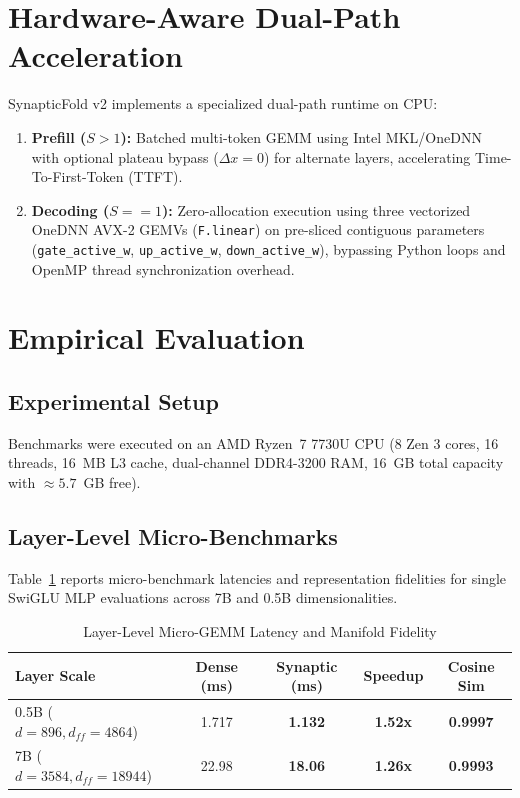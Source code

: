 \documentclass[10pt,journal,compsoc]{IEEEtran}
\theoremstyle{definition}
\begin{document}
\section{Hardware-Aware Dual-Path Acceleration}
SynapticFold v2 implements a specialized dual-path runtime on CPU:
\begin{enumerate}
    \item \textbf{Prefill ($S > 1$):} Batched multi-token GEMM using Intel MKL/OneDNN with optional plateau bypass ($\Delta x = 0$) for alternate layers, accelerating Time-To-First-Token (TTFT).
    \item \textbf{Decoding ($S == 1$):} Zero-allocation execution using three vectorized OneDNN AVX-2 GEMVs (\texttt{F.linear}) on pre-sliced contiguous parameters (\texttt{gate\_active\_w}, \texttt{up\_active\_w}, \texttt{down\_active\_w}), bypassing Python loops and OpenMP thread synchronization overhead.
\end{enumerate}

\section{Empirical Evaluation}

\subsection{Experimental Setup}
Benchmarks were executed on an AMD Ryzen~7 7730U CPU (8 Zen 3 cores, 16 threads, 16~MB L3 cache, dual-channel DDR4-3200 RAM, 16~GB total capacity with $\approx 5.7$~GB free).

\subsection{Layer-Level Micro-Benchmarks}
Table~\ref{tab:micro} reports micro-benchmark latencies and representation fidelities for single SwiGLU MLP evaluations across 7B and 0.5B dimensionalities.

\begin{table}[h]
\caption{Layer-Level Micro-GEMM Latency and Manifold Fidelity}
\label{tab:micro}
\centering
\begin{tabular}{lcccc}
\toprule
\textbf{Layer Scale} & \textbf{Dense (ms)} & \textbf{Synaptic (ms)} & \textbf{Speedup} & \textbf{Cosine Sim} \\
\midrule
0.5B ($d=896, d_{ff}=4864$) & 1.717 & \textbf{1.132} & \textbf{1.52x} & \textbf{0.9997} \\
7B ($d=3584, d_{ff}=18944$) & 22.98 & \textbf{18.06} & \textbf{1.26x} & \textbf{0.9993} \\
\bottomrule
\end{tabular}
\end{table}
\end{document}
